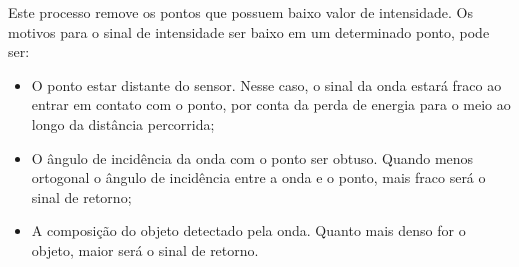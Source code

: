 Este processo remove os pontos que possuem baixo valor de intensidade. Os motivos para o sinal de intensidade ser baixo em um determinado ponto, pode ser:
    \begin{itemize}
        \item O ponto estar distante do sensor. Nesse caso, o sinal da onda estará fraco ao entrar em contato com o ponto, por conta da perda de energia para o meio ao longo da distância percorrida;
        \item O ângulo de incidência da onda com o ponto ser obtuso. Quando menos ortogonal o ângulo de incidência entre a onda e o ponto, mais fraco será o sinal de retorno;
        \item A composição do objeto detectado pela onda. Quanto mais denso for o objeto, maior será o sinal de retorno.
    \end{itemize}


